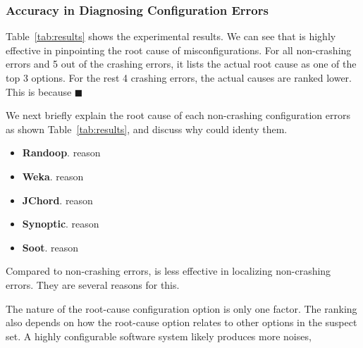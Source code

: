 \begin{table*}[t]
\end{table*}


\subsubsection{Accuracy in Diagnosing Configuration Errors}

Table~\ref{tab:results} shows the experimental results.
We can see that \ourtool is highly effective in pinpointing the root cause of
misconfigurations. For all \noncrash non-crashing errors
and 5 out of the \crash crashing errors, it lists the actual root cause as one of the
top 3 options. For the rest
4 crashing errors, the actual causes are ranked lower.
This is because $\blacksquare$


We next briefly explain the root cause of each non-crashing configuration
errors as shown Table~\ref{tab:results}, and discuss why
\ourtool could identy them. 

\begin{itemize}
\item \textbf{Randoop}. reason
\item \textbf{Weka}. reason
\item \textbf{JChord}. reason
\item \textbf{Synoptic}. reason
\item \textbf{Soot}. reason
\end{itemize}

Compared to non-crashing errors, \ourtool is less effective
in localizing non-crashing errors. They are several reasons
for this.

The nature of the root-cause configuration option is only one factor.
The ranking also depends on how the root-cause option relates to
other options in the suspect set. A highly configurable software system 
likely produces more noises, 

